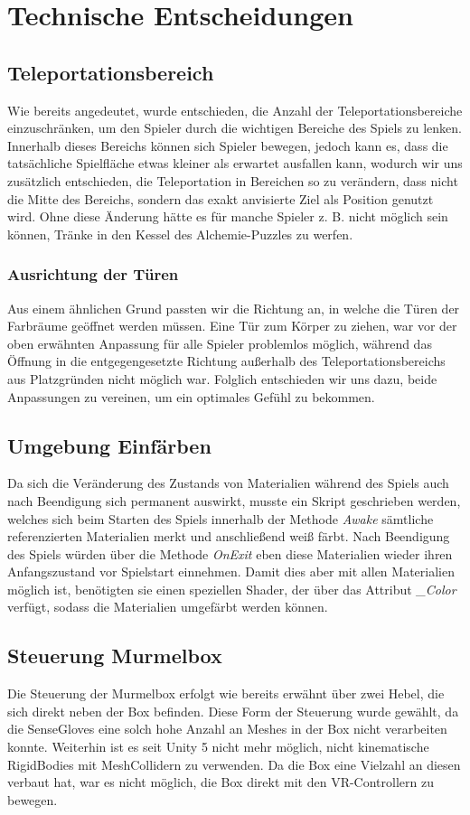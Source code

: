 \section{Technische Entscheidungen}
\subsection{Teleportationsbereich}
Wie bereits angedeutet, wurde entschieden, die Anzahl der Teleportationsbereiche einzuschränken, um den Spieler durch die wichtigen Bereiche des Spiels zu lenken. Innerhalb dieses Bereichs können sich Spieler bewegen, jedoch kann es, dass die tatsächliche Spielfläche etwas kleiner als erwartet ausfallen kann, wodurch wir uns zusätzlich entschieden, die Teleportation in Bereichen so zu verändern, dass nicht die Mitte des Bereichs, sondern das exakt anvisierte Ziel als Position genutzt wird. Ohne diese Änderung hätte es für manche Spieler z. B. nicht möglich sein können, Tränke in den Kessel des Alchemie-Puzzles zu werfen.
\subsubsection{Ausrichtung der Türen}
Aus einem ähnlichen Grund passten wir die Richtung an, in welche die Türen der Farbräume geöffnet werden müssen. Eine Tür zum Körper zu ziehen, war vor der oben erwähnten Anpassung für alle Spieler problemlos möglich, während das Öffnung in die entgegengesetzte Richtung außerhalb des Teleportationsbereichs aus Platzgründen nicht möglich war. Folglich entschieden wir uns dazu, beide Anpassungen zu vereinen, um ein optimales Gefühl zu bekommen.
\subsection{Umgebung Einfärben}
Da sich die Veränderung des Zustands von Materialien während des Spiels auch nach Beendigung sich permanent auswirkt, musste ein Skript geschrieben werden, welches sich beim Starten des Spiels innerhalb der Methode \textit{Awake} sämtliche referenzierten Materialien merkt und anschließend weiß färbt. Nach Beendigung des Spiels würden über die Methode \textit{OnExit} eben diese Materialien wieder ihren Anfangszustand vor Spielstart einnehmen. Damit dies aber mit allen Materialien möglich ist, benötigten sie einen speziellen Shader, der über das Attribut \textit{\_Color} verfügt, sodass die Materialien umgefärbt werden können.
\subsection{Steuerung Murmelbox}
Die Steuerung der Murmelbox erfolgt wie bereits erwähnt über zwei Hebel, die sich direkt neben der Box befinden. Diese Form der Steuerung wurde gewählt, da die SenseGloves eine solch hohe Anzahl an Meshes in der Box nicht verarbeiten konnte. Weiterhin ist es seit Unity 5 nicht mehr möglich, nicht kinematische RigidBodies mit MeshCollidern zu verwenden. Da die Box eine Vielzahl an diesen verbaut hat, war es nicht möglich, die Box direkt mit den VR-Controllern zu bewegen.
